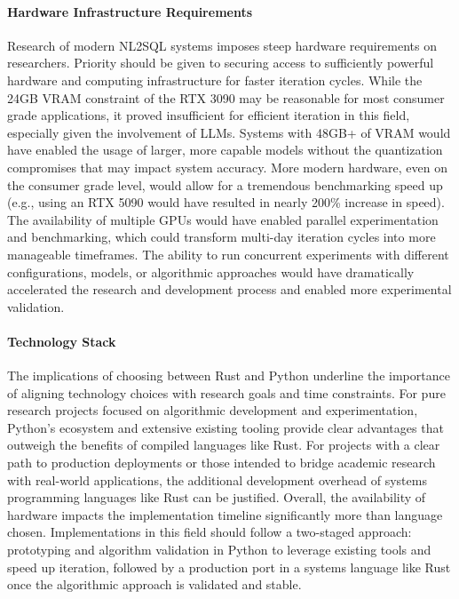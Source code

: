 \paragraph{Hardware Infrastructure Requirements}

Research of modern NL2SQL systems imposes steep hardware requirements on
researchers. Priority should be given to securing access to sufficiently
powerful hardware and computing infrastructure for faster iteration cycles.
While the 24GB VRAM constraint of the RTX 3090 may be reasonable for most
consumer grade applications, it proved insufficient for efficient iteration in
this field, especially given the involvement of LLMs. Systems with 48GB+ of
VRAM would have enabled the usage of larger, more capable models without the
quantization compromises that may impact system accuracy. More modern hardware,
even on the consumer grade level, would allow for a tremendous benchmarking
speed up (e.g., using an RTX 5090 would have resulted in nearly 200\% increase
in speed). The availability of multiple GPUs would have enabled parallel
experimentation and benchmarking, which could transform multi-day iteration
cycles into more manageable timeframes. The ability to run concurrent
experiments with different configurations, models, or algorithmic approaches
would have dramatically accelerated the research and development process and
enabled more experimental validation.

\paragraph{Technology Stack}

The implications of choosing between Rust and Python underline the importance
of aligning technology choices with research goals and time constraints. For pure
research projects focused on algorithmic development and experimentation,
Python's ecosystem and extensive existing tooling provide clear advantages that
outweigh the benefits of compiled languages like Rust. For projects with a
clear path to production deployments or those intended to bridge academic
research with real-world applications, the additional development overhead of
systems programming languages like Rust can be justified. Overall, the
availability of hardware impacts the implementation timeline significantly more
than language chosen. Implementations in this field should follow a two-staged
approach: prototyping and algorithm validation in Python to leverage existing
tools and speed up iteration, followed by a production port in a systems
language like Rust once the algorithmic approach is validated and stable.


